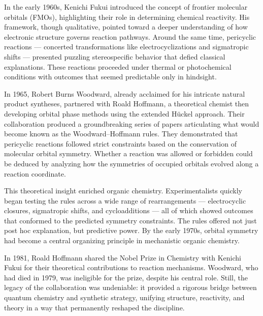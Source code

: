 \begin{historical}
In the early 1960s, Kenichi Fukui introduced the concept of frontier molecular orbitals (FMOs), highlighting their role in determining chemical reactivity. His framework, though qualitative, pointed toward a deeper understanding of how electronic structure governs reaction pathways. Around the same time, pericyclic reactions — concerted transformations like electrocyclizations and sigmatropic shifts — presented puzzling stereospecific behavior that defied classical explanations. These reactions proceeded under thermal or photochemical conditions with outcomes that seemed predictable only in hindsight.

In 1965, Robert Burns Woodward, already acclaimed for his intricate natural product syntheses, partnered with Roald Hoffmann, a theoretical chemist then developing orbital phase methods using the extended Hückel approach. Their collaboration produced a groundbreaking series of papers articulating what would become known as the Woodward–Hoffmann rules. They demonstrated that pericyclic reactions followed strict constraints based on the conservation of molecular orbital symmetry. Whether a reaction was allowed or forbidden could be deduced by analyzing how the symmetries of occupied orbitals evolved along a reaction coordinate.

This theoretical insight enriched organic chemistry. Experimentalists quickly began testing the rules across a wide range of rearrangements — electrocyclic closures, sigmatropic shifts, and cycloadditions — all of which showed outcomes that conformed to the predicted symmetry constraints. The rules offered not just post hoc explanation, but predictive power. By the early 1970s, orbital symmetry had become a central organizing principle in mechanistic organic chemistry.

In 1981, Roald Hoffmann shared the Nobel Prize in Chemistry with Kenichi Fukui for their theoretical contributions to reaction mechanisms. Woodward, who had died in 1979, was ineligible for the prize, despite his central role. Still, the legacy of the collaboration was undeniable: it provided a rigorous bridge between quantum chemistry and synthetic strategy, unifying structure, reactivity, and theory in a way that permanently reshaped the discipline.
\end{historical}
